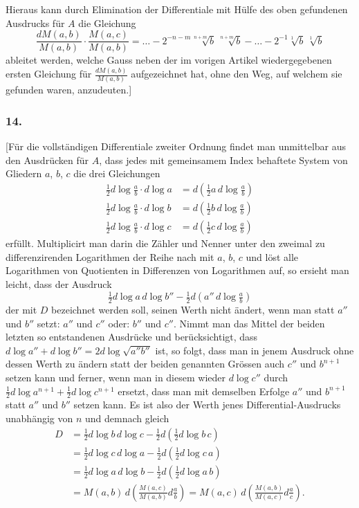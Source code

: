 \documentclass[12pt,a4paper]{article}
\begin{document}
Hieraus kann durch Elimination der Differentiale mit H\"ulfe des oben gefundenen Ausdrucks f\"ur $A$ die Gleichung
\[
\frac{dM(a,b)}{M(a,b)}\cdot\frac{M(a,c)}{M(a,b)} = \dots - 2^{-n-m}\sqrt[n+m]{b}\,\sqrt[n+m]{b} - \dots - 2^{-1}\sqrt[1]{b}\,\sqrt[1]{b}
\]
ableitet werden, welche Gauss neben der im vorigen Artikel wiedergegebenen ersten Gleichung f\"ur $\frac{dM(a,b)}{M(a,b)}$ aufgezeichnet hat, ohne den Weg, auf welchem sie gefunden waren, anzudeuten.]

\subsubsection*{14.}

[F\"ur die vollst\"andigen Differentiale zweiter Ordnung findet man unmittelbar aus den Ausdr\"ucken f\"ur $A$, dass jedes mit gemeinsamem Index behaftete System von Gliedern $a$, $b$, $c$ die drei Gleichungen
\[
\begin{aligned}
\tfrac{1}{2}d\log\tfrac{a}{b}\cdot d\log a &= d(\tfrac{1}{2}a\,d\log\tfrac{a}{b}) \\
\tfrac{1}{2}d\log\tfrac{a}{b}\cdot d\log b &= d(\tfrac{1}{2}b\,d\log\tfrac{a}{b}) \\
\tfrac{1}{2}d\log\tfrac{a}{b}\cdot d\log c &= d(\tfrac{1}{2}c\,d\log\tfrac{a}{b})
\end{aligned}
\]
erf\"ullt. Multiplicirt man darin die Z\"ahler und Nenner unter den zweimal zu differenzirenden Logarithmen der Reihe nach mit $a$, $b$, $c$ und l\"ost alle Logarithmen von Quotienten in Differenzen von Logarithmen auf, so ersieht man leicht, dass der Ausdruck
\[
\tfrac{1}{2}d\log a\,d\log b'' - \tfrac{1}{2}d(a''\,d\log\tfrac{a}{b})
\]
der mit $D$ bezeichnet werden soll, seinen Werth nicht \"andert, wenn man statt $a''$ und $b''$ setzt: $a''$ und $c''$ oder: $b''$ und $c''$. Nimmt man das Mittel der beiden letzten so entstandenen Ausdr\"ucke und ber\"ucksichtigt, dass $d\log a'' + d\log b'' = 2d\log\sqrt{a''b''}$ ist, so folgt, dass man in jenem Ausdruck ohne dessen Werth zu \"andern statt der beiden genannten Gr\"ossen auch $c''$ und $b^{n+1}$ setzen kann und ferner, wenn man in diesem wieder $d\log c''$ durch $\tfrac{1}{2}d\log a^{n+1} + \tfrac{1}{2}d\log c^{n+1}$ ersetzt, dass man mit demselben Erfolge $a''$ und $b^{n+1}$ statt $a''$ und $b''$ setzen kann. Es ist also der Werth jenes Differential-Ausdrucks unabh\"angig von $n$ und demnach gleich
\[
\begin{aligned}
D &= \tfrac{1}{2}d\log b\,d\log c - \tfrac{1}{2}d(\tfrac{1}{2}d\log b\,c) \\
&= \tfrac{1}{2}d\log c\,d\log a - \tfrac{1}{2}d(\tfrac{1}{2}d\log c\,a) \\
&= \tfrac{1}{2}d\log a\,d\log b - \tfrac{1}{2}d(\tfrac{1}{2}d\log a\,b) \\
&= M(a,b)\,d\left(\frac{M(a,c)}{M(a,b)}d\frac{a}{b}\right) = M(a,c)\,d\left(\frac{M(a,b)}{M(a,c)}d\frac{a}{c}\right).
\end{aligned}
\]
\end{document}
